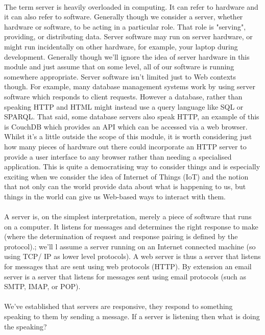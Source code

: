 \paragraph{} The term server is heavily overloaded in computing. It can refer to hardware and it can also refer to software. Generally though we consider a server, whether hardware or software, to be acting in a particular role. That role is "serving", providing, or distributing data. Server software may run on server hardware, or might run incidentally on other hardware, for example, your laptop during development. Generally though we'll ignore the idea of server hardware in this module and just assume that on some level, all of our software is running somewhere appropriate. Server software isn't limited just to Web contexts though. For example, many database management systems work by using server software which responds to client requests. However a database, rather than speaking HTTP and HTML might instead use a query language like SQL or SPARQL. That said, some database servers also speak HTTP, an example of this is CouchDB which provides an API which can be accessed via a web browser. Whilst it's a little outside the scope of this module, it is worth considering just how many pieces of hardware out there could incorporate an HTTP server to provide a user interface to any browser rather than needing a specialised application. This is quite a democratising way to consider things and is especially exciting when we consider the idea of Internet of Things (IoT) and the notion that not only can the world provide data about what is happening to us, but things in the world can give us Web-based ways to interact with them.
\paragraph{} A server is, on the simplest interpretation, merely a piece of software that runs on a computer. It listens for messages and determines the right response to make (where the determination of request and response pairing is defined by the protocol).; we’ll l assume a server running on an Internet connected machine (so using TCP/ IP as lower level protocols). A web server is thus a server that listens for messages that are sent using web protocols (HTTP). By extension an email server is a server that listens for messages sent using email protocols (such as SMTP, IMAP, or POP).
\paragraph{} We've established that servers are responsive, they respond to something speaking to them by sending a message. If a server is listening then what is doing the speaking? 

